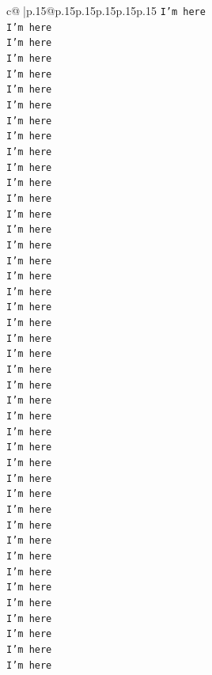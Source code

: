 \documentclass{article}
\begin{document}
{\begin{supertabular}{c@{$\;$}|p{.15\linewidth}@{}p{.15\linewidth}p{.15\linewidth}p{.15\linewidth}p{.15\linewidth}p{.15\linewidth}}
{{{\texttt{I'm here} \\
\texttt{I'm here} \\
\texttt{I'm here} \\
\texttt{I'm here} \\
\texttt{I'm here} \\
\texttt{I'm here} \\
\texttt{I'm here} \\
\texttt{I'm here} \\
\texttt{I'm here} \\
\texttt{I'm here} \\
\texttt{I'm here} \\
\texttt{I'm here} \\
\texttt{I'm here} \\
\texttt{I'm here} \\
\texttt{I'm here} \\
\texttt{I'm here} \\
\texttt{I'm here} \\
\texttt{I'm here} \\
\texttt{I'm here} \\
\texttt{I'm here} \\
\texttt{I'm here} \\
\texttt{I'm here} \\
\texttt{I'm here} \\
\texttt{I'm here} \\
\texttt{I'm here} \\
\texttt{I'm here} \\
\texttt{I'm here} \\
\texttt{I'm here} \\
\texttt{I'm here} \\
\texttt{I'm here} \\
\texttt{I'm here} \\
\texttt{I'm here} \\
\texttt{I'm here} \\
\texttt{I'm here} \\
\texttt{I'm here} \\
\texttt{I'm here} \\
\texttt{I'm here} \\
\texttt{I'm here} \\
\texttt{I'm here} \\
\texttt{I'm here} \\
\texttt{I'm here} \\
\texttt{I'm here} \\
\texttt{I'm here} \\
}}}
\end{supertabular}}
\end{document}
